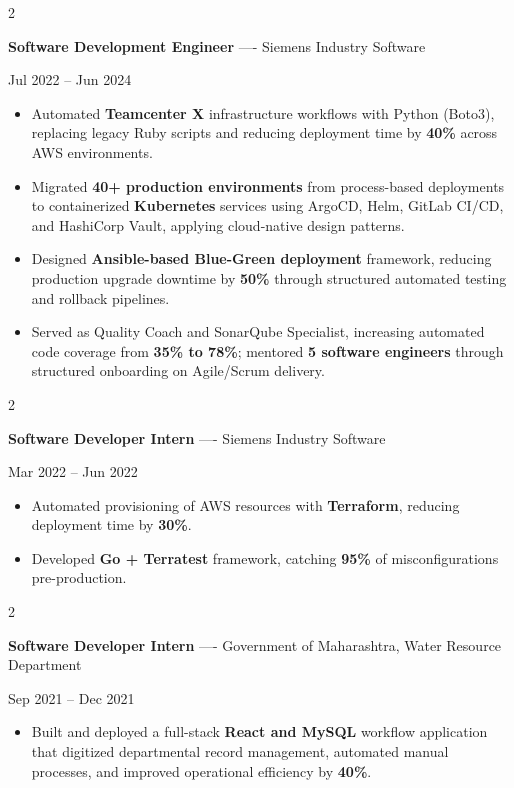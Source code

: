 \documentclass[10pt, letterpaper]{article}
\newenvironment{highlights}{
    \begin{itemize}[
        topsep=0.10 cm,
        parsep=0.06 cm,
        partopsep=0pt,
        itemsep=0.06 cm,
        leftmargin=12pt
    ]
}{
    \end{itemize}
}
\newenvironment{twocolentry}[2][]{
    \onecolentry
    \def\secondColumn{#2}
    \setcolumnwidth{\fill, 4.5 cm}
    \begin{paracol}{2}
}{
    \switchcolumn \raggedleft \secondColumn
    \end{paracol}
    \endonecolentry
}
\begin{document}
\vspace{0.15 cm}

\begin{twocolentry}{Jul 2022 -- Jun 2024}
\textbf{Software Development Engineer} ---- Siemens Industry Software
\end{twocolentry}
\begin{highlights}
  \item Automated \textbf{Teamcenter X} infrastructure workflows with Python (Boto3), replacing legacy Ruby scripts and reducing deployment time by \textbf{40\%} across AWS environments.
  \item Migrated \textbf{40+ production environments} from process-based deployments to containerized \textbf{Kubernetes} services using ArgoCD, Helm, GitLab CI/CD, and HashiCorp Vault, applying cloud-native design patterns.
  \item Designed \textbf{Ansible-based Blue-Green deployment} framework, reducing production upgrade downtime by \textbf{50\%} through structured automated testing and rollback pipelines.
  \item Served as Quality Coach and SonarQube Specialist, increasing automated code coverage from \textbf{35\% to 78\%}; mentored \textbf{5 software engineers} through structured onboarding on Agile/Scrum delivery.
\end{highlights}

\vspace{0.15 cm}

\begin{twocolentry}{Mar 2022 -- Jun 2022}
\textbf{Software Developer Intern} ---- Siemens Industry Software
\end{twocolentry}
\begin{highlights}
  \item Automated provisioning of AWS resources with \textbf{Terraform}, reducing deployment time by \textbf{30\%}.
  \item Developed \textbf{Go + Terratest} framework, catching \textbf{95\%} of misconfigurations pre-production.
\end{highlights}

\vspace{0.15 cm}

\begin{twocolentry}{Sep 2021 -- Dec 2021}
\textbf{Software Developer Intern} ---- Government of Maharashtra, Water Resource Department
\end{twocolentry}
\begin{highlights}
  \item Built and deployed a full-stack \textbf{React and MySQL} workflow application that digitized departmental record management, automated manual processes, and improved operational efficiency by \textbf{40\%}.
\end{highlights}
\end{document}
